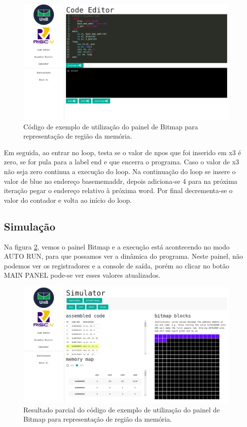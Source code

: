 	\begin{figure}[h!]
	  \centering
	  \includegraphics[width=14cm]{img/codigo_bitmap.png}
	  \caption{Código de exemplo de utilização do painel de Bitmap para representação de região da memória.}
	  \label{fig:codigo-bitmap}
	\end{figure}

	Em seguida, ao entrar no loop, testa se o valor de n\textunderscore pos que foi inserido em x3 é zero, se for pula para a label end e que encerra o programa. Caso o valor de x3 não seja zero continua a execução do loop. Na continuação do loop se insere o valor de blue no endereço base\textunderscore mem\textunderscore addr, depois adiciona-se 4 para na próxima iteração pegar o endereço relativo à próxima word. Por final decrementa-se o valor do contador e volta ao início do loop.


\subsection{Simulação}
	
	Na figura \ref{fig:simulation-bitmap-bitmap-panel}, vemos o painel Bitmap e a execução está acontecendo no modo AUTO RUN, para que possamos ver a dinâmica do programa. Neste painel, não podemos ver os registradores e a console de saída, porém ao clicar no botão MAIN PANEL pode-se ver esses valores atualizados.

	\begin{figure}[h!]
	  \centering
	  \includegraphics[width=14cm]{img/simulation_bitmap_bitmap_panel.png}
	  \caption{Resultado parcial do código de exemplo de utilização do painel de Bitmap para representação de região da memória.}
	  \label{fig:simulation-bitmap-bitmap-panel}
	\end{figure}

